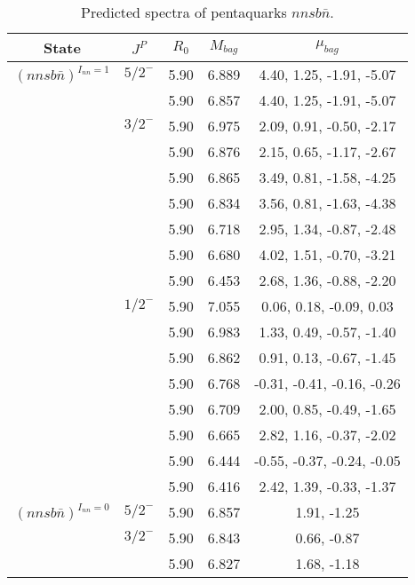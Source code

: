 \documentclass[prd,twocolumn,floatfix,nofootinbib]{revtex4}
\begin{document}
\renewcommand{\tabcolsep}{0.5cm}
\renewcommand{\arraystretch}{1.2}
\begin{table*}[!htbp]
    \caption{Predicted spectra of pentaquarks $nnsb\bar{n}$.}
    \begin{tabular}{ccccc}
        \hline\hline
        {\rm State} &$J^{P}$ &$R_{0}$ &$M_{bag}$ &$\mu_{bag}$ \\ \hline
        ${(nnsb\bar{n})}^{I_{nn}=1}$
            &${5/2}^{-}$    &5.90   &6.889  &4.40, 1.25, -1.91, -5.07 \\
            &               &5.90   &6.857  &4.40, 1.25, -1.91, -5.07 \\
            &${3/2}^{-}$    &5.90   &6.975  &2.09, 0.91, -0.50, -2.17 \\
            &               &5.90   &6.876  &2.15, 0.65, -1.17, -2.67 \\
            &               &5.90   &6.865  &3.49, 0.81, -1.58, -4.25 \\
            &               &5.90   &6.834  &3.56, 0.81, -1.63, -4.38 \\
            &               &5.90   &6.718  &2.95, 1.34, -0.87, -2.48 \\
            &               &5.90   &6.680  &4.02, 1.51, -0.70, -3.21 \\
            &               &5.90   &6.453  &2.68, 1.36, -0.88, -2.20 \\
            &${1/2}^{-}$    &5.90   &7.055  &0.06, 0.18, -0.09, 0.03 \\
            &               &5.90   &6.983  &1.33, 0.49, -0.57, -1.40 \\
            &               &5.90   &6.862  &0.91, 0.13, -0.67, -1.45 \\
            &               &5.90   &6.768  &-0.31, -0.41, -0.16, -0.26 \\
            &               &5.90   &6.709  &2.00, 0.85, -0.49, -1.65 \\
            &               &5.90   &6.665  &2.82, 1.16, -0.37, -2.02 \\
            &               &5.90   &6.444  &-0.55, -0.37, -0.24, -0.05 \\
            &               &5.90   &6.416  &2.42, 1.39, -0.33, -1.37 \\
        ${(nnsb\bar{n})}^{I_{nn}=0}$
            &${5/2}^{-}$    &5.90   &6.857  &1.91, -1.25 \\
            &${3/2}^{-}$    &5.90   &6.843  &0.66, -0.87 \\
            &               &5.90   &6.827  &1.68, -1.18 \\

\end{tabular}
\end{table*}
\end{document}

